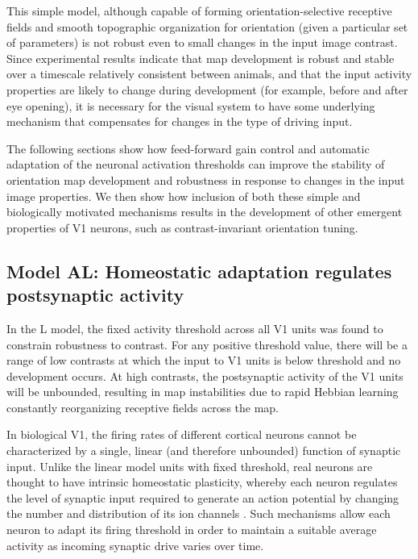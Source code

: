 \documentclass{article}
\begin{document}
This simple model, although capable of forming orientation-selective
receptive fields and smooth topographic organization for orientation
(given a particular set of parameters) is not robust even to small
changes in the input image contrast.  Since experimental results
indicate that map development is robust and stable over a timescale
relatively consistent between animals, and that the input activity
properties are likely to change during development (for example,
before and after eye opening), it is necessary for the visual system
to have some underlying mechanism that compensates for changes in the
type of driving input.

The following sections show how feed-forward gain control and
automatic adaptation of the neuronal activation thresholds can improve
the stability of orientation map development and robustness in
response to changes in the input image properties.  We then show how
inclusion of both these simple and biologically motivated mechanisms
results in the development of other emergent properties of V1 neurons,
such as contrast-invariant orientation tuning.

\subsection*{Model AL: Homeostatic adaptation regulates postsynaptic activity}

In the L model, the fixed activity threshold across all V1 units was
found to constrain robustness to contrast. For any positive threshold
value, there will be a range of low contrasts at which the input to V1
units is below threshold and no development occurs. At high contrasts,
the postsynaptic activity of the V1 units will be unbounded, resulting
in map instabilities due to rapid Hebbian learning constantly
reorganizing receptive fields across the map.

In biological V1, the firing rates of different cortical neurons cannot be
characterized by a single, linear (and therefore unbounded) function
of synaptic input. Unlike the linear model units with fixed threshold,
real neurons are thought to have intrinsic homeostatic plasticity,
whereby each neuron regulates the level of synaptic input required to
generate an action potential by changing the number and distribution
of its ion channels \citep{Davis2001,Daoudal2003,Schulz2006,Zhang2003,Grubb2010,Kuba2010}. Such mechanisms allow each neuron
to adapt its firing threshold in order to maintain a
suitable average activity as incoming synaptic drive varies over time.
\end{document}
